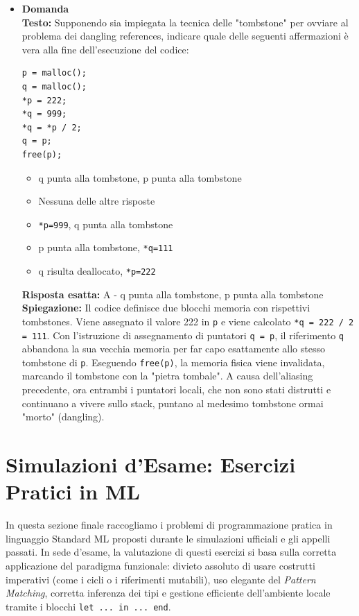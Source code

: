 \documentclass[12pt, a4paper]{article}
\newcounter{domandateoria}
\begin{document}
\begin{itemize}
    \item {}\textbf{Domanda \thedomandateoria} \\
    \textbf{Testo:} Supponendo sia impiegata la tecnica delle "tombstone" per ovviare al problema dei dangling references, indicare quale delle seguenti affermazioni è vera alla fine dell'esecuzione del codice:
\begin{verbatim}
p = malloc();
q = malloc();
*p = 222;
*q = 999;
*q = *p / 2;
q = p;
free(p);
\end{verbatim}
    \begin{itemize}
        \item[A)] q punta alla tombstone, p punta alla tombstone
        \item[B)] Nessuna delle altre risposte
        \item[C)] \texttt{*p=999}, q punta alla tombstone
        \item[D)] p punta alla tombstone, \texttt{*q=111}
        \item[E)] q risulta deallocato, \texttt{*p=222}
    \end{itemize}
    \textbf{Risposta esatta:} A - q punta alla tombstone, p punta alla tombstone \\
    \textbf{Spiegazione:} Il codice definisce due blocchi memoria con rispettivi tombstones. Viene assegnato il valore 222 in \texttt{p} e viene calcolato \texttt{*q = 222 / 2 = 111}. Con l'istruzione di assegnamento di puntatori \texttt{q = p}, il riferimento \texttt{q} abbandona la sua vecchia memoria per far capo esattamente allo stesso tombstone di \texttt{p}. Eseguendo \texttt{free(p)}, la memoria fisica viene invalidata, marcando il tombstone con la "pietra tombale". A causa dell'aliasing precedente, ora entrambi i puntatori locali, che non sono stati distrutti e continuano a vivere sullo stack, puntano al medesimo tombstone ormai "morto" (dangling).
    \vspace{0.3cm}
\end{itemize}

\section{Simulazioni d'Esame: Esercizi Pratici in ML}

In questa sezione finale raccogliamo i problemi di programmazione pratica in linguaggio Standard ML proposti durante le simulazioni ufficiali e gli appelli passati. In sede d'esame, la valutazione di questi esercizi si basa sulla corretta applicazione del paradigma funzionale: divieto assoluto di usare costrutti imperativi (come i cicli o i riferimenti mutabili), uso elegante del \textit{Pattern Matching}, corretta inferenza dei tipi e gestione efficiente dell'ambiente locale tramite i blocchi \texttt{let ... in ... end}.
\end{document}
